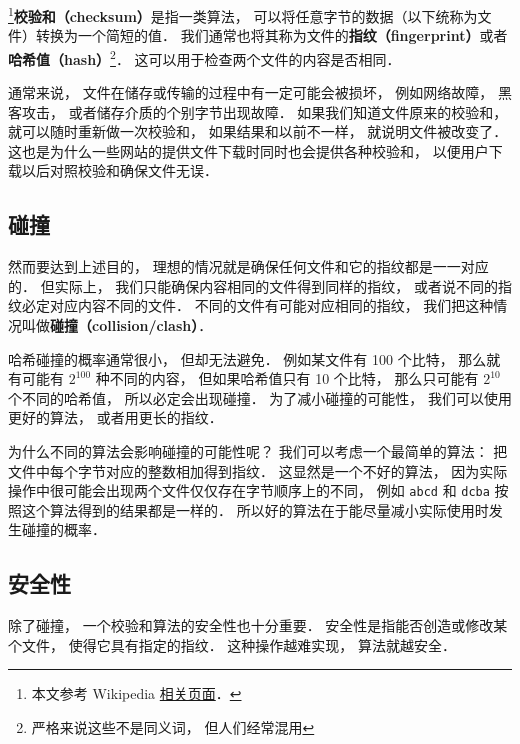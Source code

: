 
\begin{issues}
\end{issues}

\footnote{本文参考 Wikipedia \href{https://en.wikipedia.org/wiki/Checksum}{相关页面}．}\textbf{校验和（checksum）}是指一类算法， 可以将任意字节的数据（以下统称为文件）转换为一个简短的值． 我们通常也将其称为文件的\textbf{指纹（fingerprint）}或者\textbf{哈希值（hash）}\footnote{严格来说这些不是同义词， 但人们经常混用}． 这可以用于检查两个文件的内容是否相同． %

通常来说， 文件在储存或传输的过程中有一定可能会被损坏， 例如网络故障， 黑客攻击， 或者储存介质的个别字节出现故障． 如果我们知道文件原来的校验和， 就可以随时重新做一次校验和， 如果结果和以前不一样， 就说明文件被改变了． 这也是为什么一些网站的提供文件下载时同时也会提供各种校验和， 以便用户下载以后对照校验和确保文件无误．

\subsection{碰撞}
然而要达到上述目的， 理想的情况就是确保任何文件和它的指纹都是一一对应的． 但实际上， 我们只能确保内容相同的文件得到同样的指纹， 或者说不同的指纹必定对应内容不同的文件． 不同的文件有可能对应相同的指纹， 我们把这种情况叫做\textbf{碰撞（collision/clash）}．

哈希碰撞的概率通常很小， 但却无法避免． 例如某文件有 100 个比特， 那么就有可能有 $2^{100}$ 种不同的内容， 但如果哈希值只有 10 个比特， 那么只可能有 $2^{10}$ 个不同的哈希值， 所以必定会出现碰撞． 为了减小碰撞的可能性， 我们可以使用更好的算法， 或者用更长的指纹．

为什么不同的算法会影响碰撞的可能性呢？ 我们可以考虑一个最简单的算法： 把文件中每个字节对应的整数相加得到指纹． 这显然是一个不好的算法， 因为实际操作中很可能会出现两个文件仅仅存在字节顺序上的不同， 例如 \verb|abcd| 和 \verb|dcba| 按照这个算法得到的结果都是一样的． 所以好的算法在于能尽量减小实际使用时发生碰撞的概率．

\subsection{安全性}
除了碰撞， 一个校验和算法的安全性也十分重要． 安全性是指能否创造或修改某个文件， 使得它具有指定的指纹． 这种操作越难实现， 算法就越安全．

